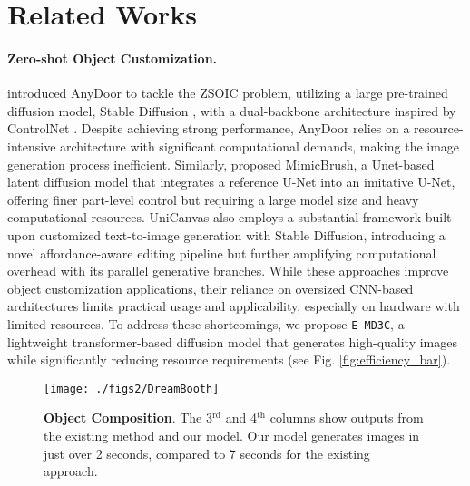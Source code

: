 \section{Related Works}
\label{related_sec}
\paragraph{Zero-shot Object Customization.}
\citet{chen2024anydoor} introduced AnyDoor to tackle the ZSOIC problem, utilizing a large pre-trained diffusion model, Stable Diffusion \cite{rombach2022high}, with a dual-backbone architecture inspired by ControlNet \cite{zhang2023adding}. Despite achieving strong performance, AnyDoor relies on a resource-intensive architecture with significant computational demands, making the image generation process inefficient. Similarly, \citet{chen2024zeroshot} proposed MimicBrush, a Unet-based latent diffusion model that integrates a reference U-Net into an imitative U-Net, offering finer part-level control but requiring a large model size and heavy computational resources. UniCanvas \cite{jin2025unicanvas} also employs a substantial framework built upon customized text-to-image generation with Stable Diffusion, introducing a novel affordance-aware editing pipeline but further amplifying computational overhead with its parallel generative branches. While these approaches improve object customization applications, their reliance on oversized CNN-based architectures limits practical usage and applicability, especially on hardware with limited resources. To address these shortcomings, we propose \texttt{E-MD3C}, a lightweight transformer-based diffusion model that generates high-quality images while significantly reducing resource requirements (see Fig. \ref{fig:efficiency_bar}).

\begin{figure}[!htbp]
  \centering
  \texttt{[image: ./figs2/DreamBooth]}
  \vspace{-10pt}
  \caption{\textbf{Object Composition}. The 3$^{\text{rd}}$ and 4$^{\text{th}}$ columns show outputs from the existing method and our model. Our model generates images in just over 2 seconds, compared to 7 seconds for the existing approach.}
  \label{fig:DreamBooth}
\vspace{-14pt}
\end{figure}

